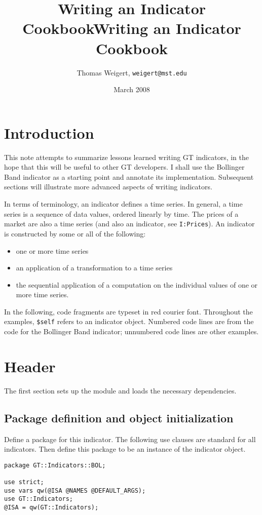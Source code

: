 \documentclass[11pt,twoside]{article}
\author{Thomas Weigert, {\tt weigert@mst.edu}}
\title{Writing an Indicator Cookbook}
\date{March 2008}
\title{Writing an Indicator Cookbook}
\begin{document}
\maketitle

\section{Introduction}
This note attempts to summarize lessons learned writing GT indicators,
in the hope that this will be useful to other GT developers. I shall
use the Bollinger Band indicator as a starting point and annotate its
implementation. Subsequent sections will illustrate more advanced
aspects of writing indicators.

In terms of terminology, an indicator defines a time series. In general,
a time series is a sequence of data values, ordered linearly by time. The
prices of a market are also a time series (and also an indicator, see \lstinline!I:Prices!). An indicator is constructed by some or all of the following:
\begin{itemize}
\item one or more time series
\item an application of a transformation to a time series
\item the sequential application of a computation on the individual
values of one or more time series.
\end{itemize}


In the following, code fragments are typeset in red courier font.
Throughout the examples, \lstinline!$self! refers to an
indicator object. Numbered code lines are from the code for the
Bollinger Band indicator; unnumbered code lines are other examples.

\section{Header}
The first section sets up the module and loads the necessary
dependencies.

\subsection{Package definition and object initialization}
Define a package for this indicator. The following use clauses are
standard for all indicators. Then define this package to be an instance
of the indicator object.

\begin{lstlisting}[name=example]
package GT::Indicators::BOL;

use strict;
use vars qw(@ISA @NAMES @DEFAULT_ARGS);
use GT::Indicators;
@ISA = qw(GT::Indicators);
\end{lstlisting}
\end{document}

